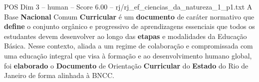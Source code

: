 \begin{textsample}{POS Dim 3 – human – Score 6.00 – rj/rj\_ef\_ciencias\_da\_natureza\_1\_p1.txt}  \label{ex:f3_pos_009}
A Base \textbf{Nacional} Comum \textbf{Curricular} é um \textbf{documento} de caráter normativo que \textbf{define} o conjunto orgânico e progressivo de aprendizagens essenciais que todos os estudantes devem desenvolver ao longo das \textbf{etapas} e modalidades da Educação Básica.
Nesse contexto, aliada a um regime de colaboração e compromissada com uma educação integral que visa à formação e ao desenvolvimento humano global, foi \textbf{elaborado} o \textbf{Documento} de Orientação \textbf{Curricular} do \textbf{Estado} do Rio de Janeiro de forma alinhada à BNCC.

\end{textsample}

